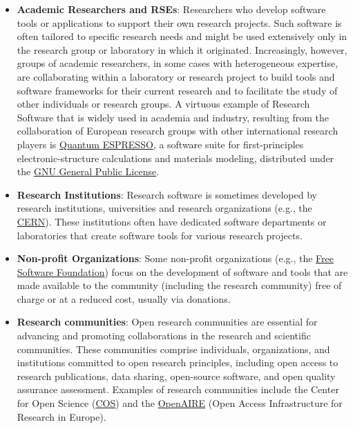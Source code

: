 \begin{itemize}
    \item \textbf{Academic Researchers and RSEs}: Researchers who develop software tools or applications to support their own research projects. Such software is often tailored to specific research needs and might be used extensively only in the research group or laboratory in which it originated. Increasingly, however, groups of academic researchers, in some cases with heterogeneous expertise, are collaborating within a laboratory or research project to build tools and software frameworks for their current research and to facilitate the study of other individuals or research groups. A virtuous example of Research Software that is widely used in academia and industry, resulting from the collaboration of European research groups with other international research players is \href{https://foundation.quantum-espresso.org/}{Quantum ESPRESSO}, a software suite for first-principles electronic-structure calculations and materials modeling, distributed under the \href{https://www.gnu.org/licenses/}{GNU General Public License}.

    \item \textbf{Research Institutions}: Research software is sometimes developed by research institutions, universities and research organizations (e.g., the \href{https://home.web.cern.ch/}{CERN}). These institutions often have dedicated software departments or laboratories that create software tools for various research projects.

    \item \textbf{Non-profit Organizations}: Some non-profit organizations (e.g., the \href{https://www.fsf.org/}{Free Software Foundation}) focus on the development of software and tools that are made available to the community (including the research community) free of charge or at a reduced cost, usually via donations.

    \item \textbf{Research communities}: Open research communities are essential for advancing and promoting collaborations in the research and scientific communities. These communities comprise individuals, organizations, and institutions committed to open research principles, including open access to research publications, data sharing, open-source software, and open quality assurance assessment. Examples of research communities include the Center for Open Science (\href{https://www.cos.io/}{COS}) and the \href{https://www.openaire.eu/}{OpenAIRE} (Open Access Infrastructure for Research in Europe).
\end{itemize}

